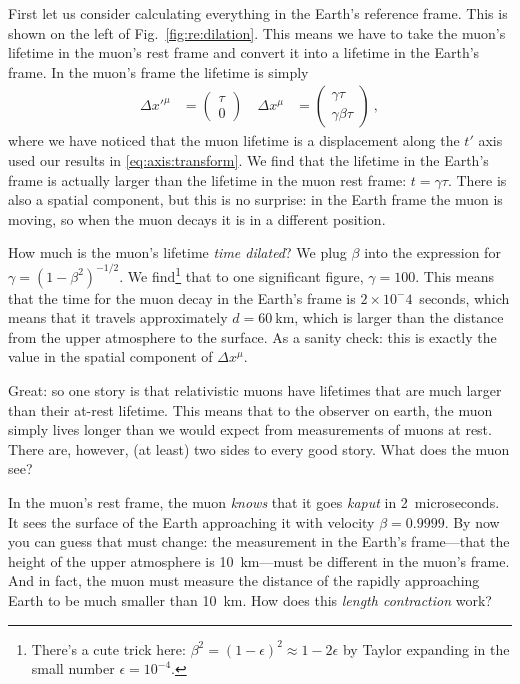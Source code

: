 \documentclass[12pt]{article}
\begin{document}
First let us consider calculating everything in the Earth's reference frame. This is shown on the left of Fig.~\ref{fig:re:dilation}. This means we have to take the muon's lifetime in the muon's rest frame and convert it into a lifetime in the Earth's frame. In the muon's frame the lifetime is simply 
\begin{align}
    \Delta x'^\mu &= 
    \begin{pmatrix}
    \tau \\ 0     
    \end{pmatrix} \ 
    &
    \Delta x^\mu &=
    \begin{pmatrix}
    \gamma \tau \\ \gamma\beta \tau    
    \end{pmatrix} \ ,
\end{align}
where we have noticed that the muon lifetime is a displacement along the $t'$ axis used our results in \eqref{eq:axis:transform}. We find that the lifetime in the Earth's frame is actually larger than the lifetime in the muon rest frame: $t = \gamma \tau$. There is also a spatial component, but this is no surprise: in the Earth frame the muon is moving, so when the muon decays it is in a different position. 

How much is the muon's lifetime \emph{time dilated}? We plug $\beta$ into the expression for $\gamma = (1-\beta^2)^{-1/2}$. We find\footnote{There's a cute trick here: $\beta^2 = (1-\epsilon)^2 \approx 1- 2\epsilon$ by Taylor expanding in the small number $\epsilon = 10^{-4}$.} that to one significant figure, $\gamma = 100$. This means that the time for the muon decay in the Earth's frame is $2\times 10^-4$~seconds, which means that it travels approximately $d=60~$km, which is larger than the distance from the upper atmosphere to the surface. As a sanity check: this is exactly the value in the spatial component of $\Delta x^\mu$.

Great: so one story is that relativistic muons have lifetimes that are much larger than their at-rest lifetime. This means that to the observer on earth, the muon simply lives longer than we would expect from measurements of muons at rest. There are, however, (at least) two sides to every good story. What does the muon see?

In the muon's rest frame, the muon \emph{knows} that it goes \emph{kaput} in 2~microseconds. It sees the surface of the Earth approaching it with velocity $\beta = 0.9999$. By now you can guess that must change: the measurement in the Earth's frame---that the height of the upper atmosphere is 10~km---must be different in the muon's frame. And in fact, the muon must measure the distance of the rapidly approaching Earth to be much smaller than 10~km. How does this \emph{length contraction} work? 
\end{document}
